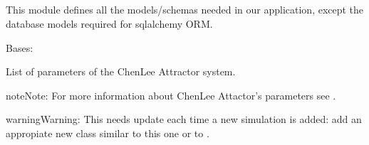 \documentclass[a4paper,landscape,10pt,english]{sphinxmanual}
\begin{document}
\subparagraph{}
\label{\detokenize{code_docs/simulation_API.controller:module-simulation_API.controller.schemas}}\label{\detokenize{code_docs/simulation_API.controller:simulation-api-controller-schemas}}
This module defines all the models/schemas needed in our application, except
the database models required for sqlalchemy ORM.

\begin{fulllineitems}
\label{\detokenize{code_docs/simulation_API.controller:simulation_API.controller.schemas.ChenLeeParams}}
Bases: 

List of parameters of the Chen\sphinxhyphen{}Lee Attractor system.

\begin{sphinxadmonition}{note}{Note:}
For more information about Chen\sphinxhyphen{}Lee Attactor’s parameters see
{\hyperref[\detokenize{code_docs/simulation_API.simulation:simulation_API.simulation.simulations.ChenLeeAttractor}]{}}.
\end{sphinxadmonition}

\begin{sphinxadmonition}{warning}{Warning:}
This needs update each time a new simulation is added: add an
appropiate new class similar to this one or to
{\hyperref[\detokenize{code_docs/simulation_API.controller:simulation_API.controller.schemas.HOParams}]{}}.
\end{sphinxadmonition}


\end{fulllineitems}
\end{document}
